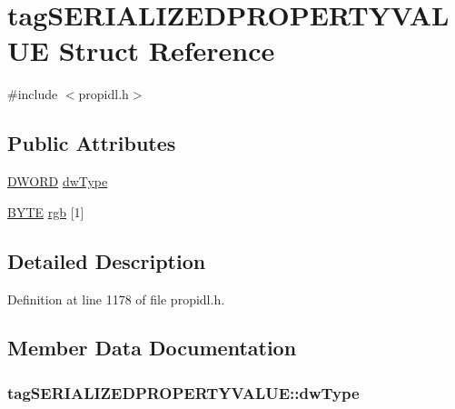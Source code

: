 \hypertarget{structtag_s_e_r_i_a_l_i_z_e_d_p_r_o_p_e_r_t_y_v_a_l_u_e}{}\section{tag\+S\+E\+R\+I\+A\+L\+I\+Z\+E\+D\+P\+R\+O\+P\+E\+R\+T\+Y\+V\+A\+L\+UE Struct Reference}
\label{structtag_s_e_r_i_a_l_i_z_e_d_p_r_o_p_e_r_t_y_v_a_l_u_e}


{\ttfamily \#include $<$propidl.\+h$>$}

\subsection*{Public Attributes}
\begin{DoxyCompactItemize}
\item 
\hyperlink{mapinls_8h_ad342ac907eb044443153a22f964bf0af}{D\+W\+O\+RD} \hyperlink{structtag_s_e_r_i_a_l_i_z_e_d_p_r_o_p_e_r_t_y_v_a_l_u_e_a30e6d579ea002e16cdc01fb6a7f53ba2}{dw\+Type}
\item 
\hyperlink{mapinls_8h_a4ae1dab0fb4b072a66584546209e7d58}{B\+Y\+TE} \hyperlink{structtag_s_e_r_i_a_l_i_z_e_d_p_r_o_p_e_r_t_y_v_a_l_u_e_a0a9e8a6ad2197ca05f086a0013d6e0b6}{rgb} \mbox{[}1\mbox{]}
\end{DoxyCompactItemize}


\subsection{Detailed Description}


Definition at line 1178 of file propidl.\+h.



\subsection{Member Data Documentation}
\subsubsection[{\texorpdfstring{dw\+Type}{dwType}}]{ tag\+S\+E\+R\+I\+A\+L\+I\+Z\+E\+D\+P\+R\+O\+P\+E\+R\+T\+Y\+V\+A\+L\+U\+E\+::dw\+Type}\hypertarget{structtag_s_e_r_i_a_l_i_z_e_d_p_r_o_p_e_r_t_y_v_a_l_u_e_a30e6d579ea002e16cdc01fb6a7f53ba2}{}\label{structtag_s_e_r_i_a_l_i_z_e_d_p_r_o_p_e_r_t_y_v_a_l_u_e_a30e6d579ea002e16cdc01fb6a7f53ba2}



